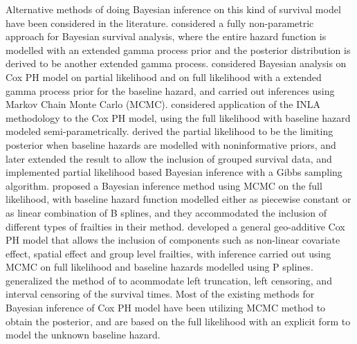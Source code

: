 \documentclass[ba]{imsart}
\begin{document}
Alternative methods of doing Bayesian inference on this kind of survival model have been considered in the literature. \cite{BayesianNonpara} considered a fully non-parametric approach for Bayesian survival analysis, where the entire hazard function is modelled with an extended gamma process prior and the posterior distribution is derived to be another extended gamma process. \cite{BayesianPartialMCMC} considered Bayesian analysis on Cox PH model on partial likelihood and on full likelihood with a extended gamma process prior for the baseline hazard, and carried out inferences using Markov Chain Monte Carlo (MCMC). \cite{inlacoxph} considered application of the INLA methodology to the Cox PH model, using the full likelihood with baseline hazard modeled semi-parametrically. \cite{PartialandFull1} derived the partial likelihood to be the limiting posterior when baseline hazards are modelled with noninformative priors, and \cite{PartialandFull2} later extended the result to allow the inclusion of grouped survival data, and implemented partial likelihood based Bayesian inference with a Gibbs sampling algorithm. \cite{henschel2009semiparametric} proposed a Bayesian inference method using MCMC on the full likelihood, with baseline hazard function modelled either as piecewise constant or as linear combination of B splines, and they accommodated the inclusion of different types of frailties in their method. \cite{hennerfeind2006geoadditive} developed a general geo-additive Cox PH model that allows the inclusion of components such as non-linear covariate effect, spatial effect and group level frailties, with inference carried out using MCMC on full likelihood and baseline hazards modelled using P splines. \cite{kneib2005geoadditive} generalized the method of \cite{hennerfeind2006geoadditive} to acommodate left truncation, left censoring, and interval censoring of the survival times. Most of the existing methods for Bayesian inference of Cox PH model have been utilizing MCMC method to obtain the posterior, and are based on the full likelihood with an explicit form to model the unknown baseline hazard.
\end{document}
